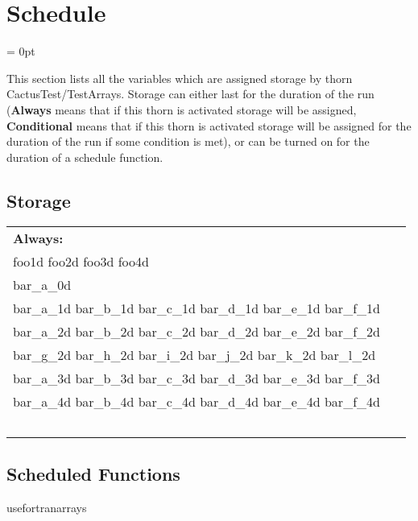 
\section{Schedule} 


\parskip = 0pt


\noindent This section lists all the variables which are assigned storage by thorn CactusTest/TestArrays.  Storage can either last for the duration of the run ({\bf Always} means that if this thorn is activated storage will be assigned, {\bf Conditional} means that if this thorn is activated storage will be assigned for the duration of the run if some condition is met), or can be turned on for the duration of a schedule function.


\subsection*{Storage}

\hspace{5mm}

 \begin{tabular*}{160mm}{ll} 

{\bf Always:}&  ~ \\ 
 foo1d foo2d foo3d foo4d & ~\\ 
 bar\_a\_0d & ~\\ 
 bar\_a\_1d bar\_b\_1d bar\_c\_1d bar\_d\_1d bar\_e\_1d bar\_f\_1d & ~\\ 
 bar\_a\_2d bar\_b\_2d bar\_c\_2d bar\_d\_2d bar\_e\_2d bar\_f\_2d & ~\\ 
 bar\_g\_2d bar\_h\_2d bar\_i\_2d bar\_j\_2d bar\_k\_2d bar\_l\_2d & ~\\ 
 bar\_a\_3d bar\_b\_3d bar\_c\_3d bar\_d\_3d bar\_e\_3d bar\_f\_3d & ~\\ 
 bar\_a\_4d bar\_b\_4d bar\_c\_4d bar\_d\_4d bar\_e\_4d bar\_f\_4d & ~\\ 
~ & ~\\ 
\end{tabular*} 


\subsection*{Scheduled Functions}
\vspace{5mm}


\hspace{5mm} usefortranarrays 

\hspace{5mm}{\it use fortran arrays } 


